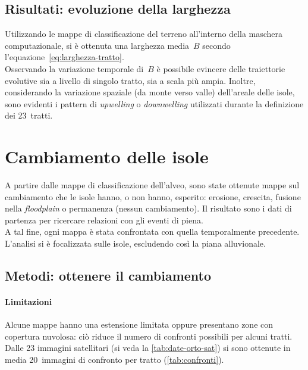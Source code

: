 \subsection{Risultati: evoluzione della larghezza}
Utilizzando le mappe di classificazione del terreno all'interno della maschera computazionale, si è ottenuta una larghezza media~$B$ secondo l'equazione~\eqref{eq:larghezza-tratto}.
\\
Osservando la variazione temporale di~$B$ è possibile evincere delle traiettorie evolutive sia a livello di singolo tratto, sia a scala più ampia.
Inoltre, considerando la variazione spaziale (da monte verso valle) dell'areale delle isole, sono evidenti i pattern di \emph{upwelling} o \emph{downwelling} utilizzati durante la definizione dei 23~tratti.






\section{Cambiamento delle isole}
A partire dalle mappe di classificazione dell'alveo, sono state ottenute mappe sul cambiamento che le isole hanno, o non hanno, esperito: erosione, crescita, fusione nella \emph{floodplain} o permanenza (nessun cambiamento).
Il risultato sono i dati di partenza per ricercare relazioni con gli eventi di piena.
\\
A tal fine, ogni mappa è stata confrontata con quella temporalmente precedente.
\\
L'analisi si è focalizzata sulle isole, escludendo così la piana alluvionale.

\subsection{Metodi: ottenere il cambiamento}
\paragraph{Limitazioni} \label{par:camb-limiti}
Alcune mappe hanno una estensione limitata oppure presentano zone con copertura nuvolosa: ciò riduce il numero di confronti possibili per alcuni tratti. 
Dalle 23 immagini satellitari (si veda la \vref{tab:date-orto-sat}) si sono ottenute in media 20~immagini di confronto per tratto (\vref{tab:confronti}).

